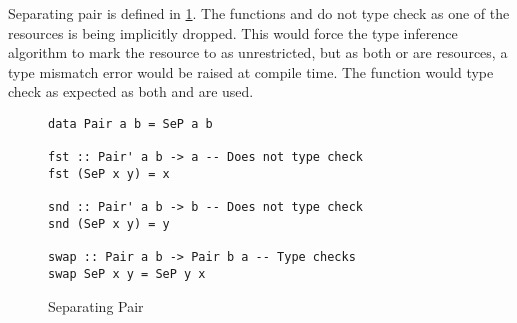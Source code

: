 Separating pair is defined in \cref{fig:sep-pair}. The functions  and  do not type check
as one of the resources is being implicitly dropped. This would force the type inference algorithm to mark the resource to as unrestricted,
but as both  or  are resources, a type mismatch error would be raised at compile time.
The  function would type check as expected as both  and  are used.

\begin{figure}[h]
  \begin{framed}
\begin{verbatim}
data Pair a b = SeP a b

fst :: Pair' a b -> a -- Does not type check
fst (SeP x y) = x

snd :: Pair' a b -> b -- Does not type check
snd (SeP x y) = y

swap :: Pair a b -> Pair b a -- Type checks
swap SeP x y = SeP y x
\end{verbatim}
  \end{framed}
  \caption{Separating Pair}
  \label{fig:sep-pair}
\end{figure}

